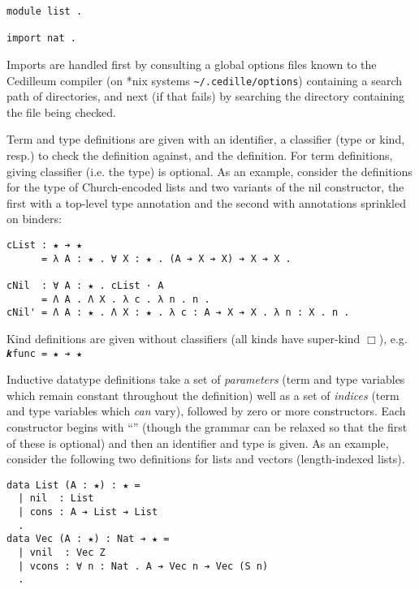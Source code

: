\documentclass{article}
\begin{document}
\begin{verbatim}
module list .

import nat .
\end{verbatim}

\noindent Imports are handled first by consulting a global options files
known to the Cedilleum compiler (on *nix systems \verb|~/.cedille/options|)
containing a search path of directories, and next (if that fails) by searching
the directory containing the file being checked.

Term and type definitions are given with an identifier, a classifier (type or
kind, resp.) to check the definition against, and the definition. For term
definitions, giving classifier (i.e. the type) is optional. As an example,
consider the definitions for the type of Church-encoded lists and two variants
of the nil constructor, the first with a top-level type annotation and the
second with annotations sprinkled on binders:

\begin{verbatim}
cList : ★ ➔ ★
      = λ A : ★ . ∀ X : ★ . (A ➔ X ➔ X) ➔ X ➔ X .

cNil  : ∀ A : ★ . cList · A
      = Λ A . Λ X . λ c . λ n . n .
cNil' = Λ A : ★ . Λ X : ★ . λ c : A ➔ X ➔ X . λ n : X . n .
\end{verbatim}

Kind definitions are given without classifiers (all kinds have super-kind
$\Box$), e.g. \verb;𝒌func = ★ ➔ ★;

Inductive datatype definitions take a set of \textit{parameters} (term and type
variables which remain constant throughout the definition) well as a set of
\textit{indices} (term and type variables which \textit{can} vary), followed by
zero or more constructors. Each constructor begins with ``\textbf{\textbar}''
(though the grammar can be relaxed so that the first of these is optional) and
then an identifier and type is given. As an example, consider the following two
definitions for lists and vectors (length-indexed lists).

\begin{verbatim}
data List (A : ★) : ★ =
  | nil  : List
  | cons : A ➔ List ➔ List
  .
data Vec (A : ★) : Nat ➔ ★ =
  | vnil  : Vec Z
  | vcons : ∀ n : Nat . A ➔ Vec n ➔ Vec (S n)
  .
\end{verbatim}
\end{document}
